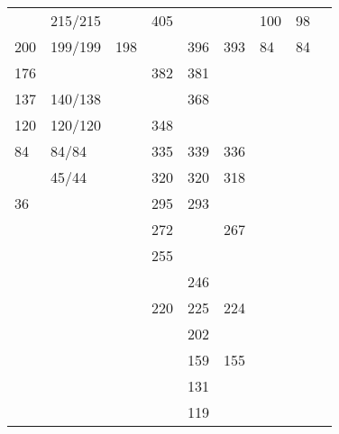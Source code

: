 \begin{table}[htb]
\begin{tabular}{lllllllll}
        & 215/215 &             & 405    &        &             & 100    & 98        &       \\
 200    & 199/199 & 198         &        & 396    & 393         & 84     & 84        &       \\
 176    &         &             & 382    & 381    &             &        &           &       \\
 137    & 140/138 &             &        & 368    &             &        &           &       \\
 120    & 120/120 &             & 348    &        &             &        &           &       \\
 84     & 84/84   &             & 335    & 339    & 336         &        &           &       \\
        & 45/44   &             & 320    & 320    & 318         &        &           &       \\
 36     &         &             & 295    & 293    &             &        &           &       \\
        &         &             & 272    &        & 267         &        &           &       \\
        &         &             & 255    &        &             &        &           &       \\
        &         &             &        & 246    &             &        &           &       \\
        &         &             & 220    & 225    & 224         &        &           &       \\
        &         &             &        & 202    &             &        &           &       \\
        &         &             &        & 159    & 155         &        &           &       \\
        &         &             &        & 131    &             &        &           &       \\
        &         &             &        & 119    &             &        &           &       \\
\bottomrule
\end{tabular}
\end{table}


